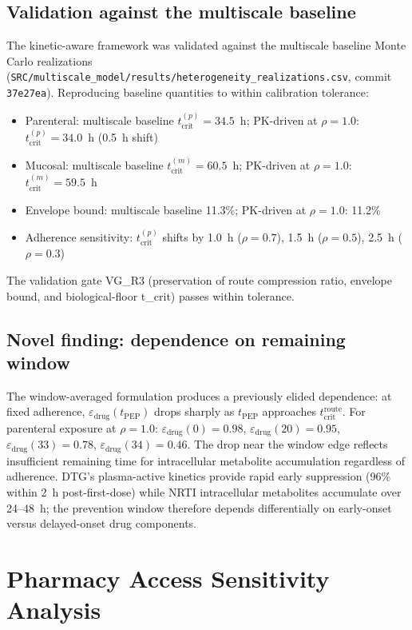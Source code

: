 \documentclass[11pt]{article}
\theoremstyle{definition}
\theoremstyle{remark}
\newcommand{\tcrit}{t_{\text{crit}}}
\begin{document}
\subsection{Validation against the multiscale baseline}

The kinetic-aware framework was validated against the multiscale baseline Monte Carlo realizations (\nolinkurl{SRC/multiscale_model/results/heterogeneity_realizations.csv}, commit \texttt{37e27ea}). Reproducing baseline quantities to within calibration tolerance:
\begin{itemize}
\item Parenteral: multiscale baseline $\tcrit^{(p)} = 34.5$~h; PK-driven at $\rho = 1.0$: $\tcrit^{(p)} = 34.0$~h (0.5~h shift)
\item Mucosal: multiscale baseline $\tcrit^{(m)} = 60.5$~h; PK-driven at $\rho = 1.0$: $\tcrit^{(m)} = 59.5$~h
\item Envelope bound: multiscale baseline 11.3\%; PK-driven at $\rho = 1.0$: 11.2\%
\item Adherence sensitivity: $\tcrit^{(p)}$ shifts by 1.0~h ($\rho = 0.7$), 1.5~h ($\rho = 0.5$), 2.5~h ($\rho = 0.3$)
\end{itemize}
The validation gate VG\_R3 (preservation of route compression ratio, envelope bound, and biological-floor t\_crit) passes within tolerance.

\subsection{Novel finding: dependence on remaining window}

The window-averaged formulation produces a previously elided dependence: at fixed adherence, $\varepsilon_{\text{drug}}(t_{\text{PEP}})$ drops sharply as $t_{\text{PEP}}$ approaches $\tcrit^{\text{route}}$. For parenteral exposure at $\rho = 1.0$: $\varepsilon_{\text{drug}}(0) = 0.98$, $\varepsilon_{\text{drug}}(20) = 0.95$, $\varepsilon_{\text{drug}}(33) = 0.78$, $\varepsilon_{\text{drug}}(34) = 0.46$. The drop near the window edge reflects insufficient remaining time for intracellular metabolite accumulation regardless of adherence. DTG's plasma-active kinetics provide rapid early suppression (96\% within 2~h post-first-dose) while NRTI intracellular metabolites accumulate over 24--48~h; the prevention window therefore depends differentially on early-onset versus delayed-onset drug components.

\section{Pharmacy Access Sensitivity Analysis}
\label{sec:S11}
\end{document}
